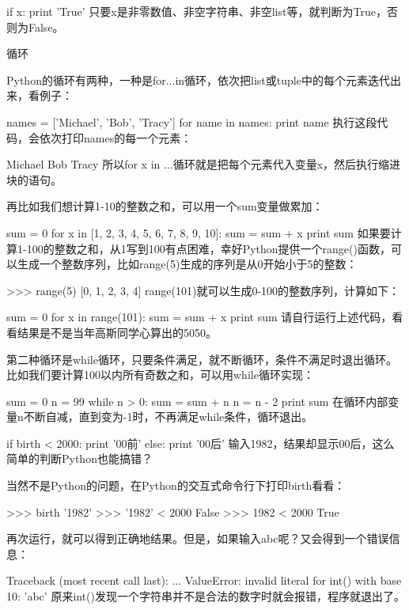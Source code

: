 \documentclass[10pt,a4paper]{ctexbook}
\begin{document}
if x:
    print 'True'
只要x是非零数值、非空字符串、非空list等，就判断为True，否则为False。

循环

Python的循环有两种，一种是for...in循环，依次把list或tuple中的每个元素迭代出来，看例子：

names = ['Michael', 'Bob', 'Tracy']
for name in names:
    print name
执行这段代码，会依次打印names的每一个元素：

Michael
Bob
Tracy
所以for x in ...循环就是把每个元素代入变量x，然后执行缩进块的语句。

再比如我们想计算1-10的整数之和，可以用一个sum变量做累加：

sum = 0
for x in [1, 2, 3, 4, 5, 6, 7, 8, 9, 10]:
    sum = sum + x
print sum
如果要计算1-100的整数之和，从1写到100有点困难，幸好Python提供一个range()函数，可以生成一个整数序列，比如range(5)生成的序列是从0开始小于5的整数：

>>> range(5)
[0, 1, 2, 3, 4]
range(101)就可以生成0-100的整数序列，计算如下：

sum = 0
for x in range(101):
    sum = sum + x
print sum
请自行运行上述代码，看看结果是不是当年高斯同学心算出的5050。

第二种循环是while循环，只要条件满足，就不断循环，条件不满足时退出循环。比如我们要计算100以内所有奇数之和，可以用while循环实现：

sum = 0
n = 99
while n > 0:
    sum = sum + n
    n = n - 2
print sum
在循环内部变量n不断自减，直到变为-1时，不再满足while条件，循环退出。



if birth < 2000:
    print '00前'
else:
    print '00后'
输入1982，结果却显示00后，这么简单的判断Python也能搞错？

当然不是Python的问题，在Python的交互式命令行下打印birth看看：

>>> birth
'1982'
>>> '1982' < 2000
False
>>> 1982 < 2000
True

再次运行，就可以得到正确地结果。但是，如果输入abc呢？又会得到一个错误信息：

Traceback (most recent call last):
  ...
ValueError: invalid literal for int() with base 10: 'abc'
原来int()发现一个字符串并不是合法的数字时就会报错，程序就退出了。
\end{document}
